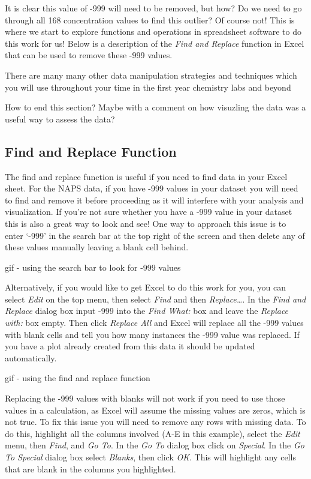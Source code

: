 \documentclass[
]{book}
\begin{document}
It is clear this value of -999 will need to be removed, but how? Do we need to go through all 168 concentration values to find this outlier? Of course not! This is where we start to explore functions and operations in spreadsheet software to do this work for us! Below is a description of the \emph{Find and Replace} function in Excel that can be used to remove these -999 values.

There are many many other data manipulation strategies and techniques which you will use throughout your time in the first year chemistry labs and beyond

How to end this section? Maybe with a comment on how visuzling the data was a useful way to assess the data?

\hypertarget{find-and-replace-function}{%
\subsection{Find and Replace Function}\label{find-and-replace-function}}

The find and replace function is useful if you need to find data in your Excel sheet. For the NAPS data, if you have -999 values in your dataset you will need to find and remove it before proceeding as it will interfere with your analysis and visualization. If you're not sure whether you have a -999 value in your dataset this is also a great way to look and see! One way to approach this issue is to enter `-999' in the search bar at the top right of the screen and then delete any of these values manually leaving a blank cell behind.

gif - using the search bar to look for -999 values

Alternatively, if you would like to get Excel to do this work for you, you can select \emph{Edit} on the top menu, then select \emph{Find} and then \emph{Replace\ldots{}}. In the \emph{Find and Replace} dialog box input -999 into the \emph{Find What:} box and leave the \emph{Replace with:} box empty. Then click \emph{Replace All} and Excel will replace all the -999 values with blank cells and tell you how many instances the -999 value was replaced. If you have a plot already created from this data it should be updated automatically.

gif - using the find and replace function

Replacing the -999 values with blanks will not work if you need to use those values in a calculation, as Excel will assume the missing values are zeros, which is not true. To fix this issue you will need to remove any rows with missing data. To do this, highlight all the columns involved (A-E in this example), select the \emph{Edit} menu, then \emph{Find}, and \emph{Go To}. In the \emph{Go To} dialog box click on \emph{Special}. In the \emph{Go To Special} dialog box select \emph{Blanks}, then click \emph{OK}. This will highlight any cells that are blank in the columns you highlighted.
\end{document}
